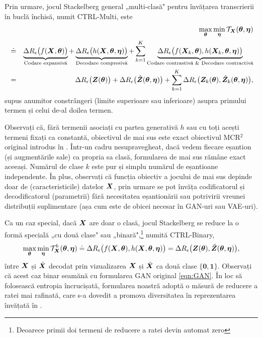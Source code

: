 \documentclass[../../book-main_ro.tex]{subfiles}
\begin{document}
Prin urmare, jocul Stackelberg general „multi-clasă" pentru învățarea transcrierii în buclă închisă, numit CTRL-Multi, este
\begin{eqnarray}
&&\max_{\bm \theta} \min_{\bm \eta} \mathcal{T}_{\bm{X}}(\bm \theta, \bm \eta) \\
&\doteq& \underbrace{\Delta R_\epsilon\big(f(\bm{X},\bm \theta)\big)}_{\text{Codare expansivă}} + \underbrace{\Delta R_\epsilon\big(h(\bm{X},\bm \theta, \bm \eta)\big)}_{\text{Decodare compresivă}} + \sum_{k=1}^K \underbrace{\Delta R_\epsilon\big(f(\bm{X}_k,\bm \theta), h(\bm{X}_k,\bm \theta,\bm \eta)\big)}_{\text{Codare contrastivă \& Decodare contractivă}}   \\
&=& \Delta R_\epsilon\big(\bm{Z}(\bm \theta) \big) + \Delta R_\epsilon\big(\hat {\bm{Z}}(\bm \theta, \bm \eta)\big) + \sum_{k=1}^K \Delta R_\epsilon\big(\bm{Z}_k(
\bm \theta), \hat {\bm{Z}}_k(\bm \theta, \bm \eta) \big),
    \label{eq:MCR2-GAN-objective}
\end{eqnarray}
supus anumitor constrângeri (limite superioare sau inferioare) asupra primului termen și celui de-al doilea termen.



Observați că, fără termenii asociați cu partea generativă $h$ sau cu toți acești termeni fixați ca constantă, obiectivul de mai sus este exact obiectivul MCR$^2$ original introdus în . Într-un cadru nesupravegheat, dacă vedem fiecare eșantion (și augmentările sale) ca propria sa clasă, formularea de mai sus rămâne exact aceeași. Numărul de clase $k$ este pur și simplu numărul de eșantioane independente. În plus, observați că funcția obiectiv a jocului de mai sus depinde doar de (caracteristicile) datelor $\bm{X}$, prin urmare se pot învăța codificatorul și decodificatorul (parametrii) fără necesitatea eșantionării sau potrivirii vreunei distribuții suplimentare (așa cum este de obicei necesar în GAN-uri sau VAE-uri).

Ca un caz special, dacă $\bm{X}$ are doar o clasă, jocul Stackelberg se reduce la o formă specială „cu două clase" sau „binară",\footnote{Deoarece primii doi termeni de reducere a ratei devin automat zero} numită CTRL-Binary,
\begin{equation}
 \max_{\bm \theta} \min_{\bm \eta} \mathcal{T}^b_{\bm{X}}(\bm \theta, \bm \eta) \doteq \Delta R_\epsilon\big(f(\bm{X},\bm \theta), h(\bm{X},\bm \theta,\bm \eta)\big) = \Delta R_\epsilon\big(\bm{Z}(\bm \theta), \hat {\bm{Z}}(\bm \theta, \bm \eta)\big),
    \label{eq:MCR2-GAN-objective-binary}
\end{equation}
între $\bm{X}$ și $\hat{\bm{X}}$ decodat prin vizualizarea $\bm{X}$ și $\hat {\bm{X}}$ ca două clase $\{\bm 0, \bm 1\}$. Observați că acest caz binar seamănă cu formularea GAN original \eqref{eqn:GAN}. În loc să folosească entropia încrucișată, formularea noastră adoptă o măsură de reducere a ratei mai rafinată, care s-a dovedit a promova diversitatea în reprezentarea învățată în .
\end{document}
